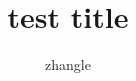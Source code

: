 \documentclass{article}
\title{test title}
\author{zhangle}
\begin{document}
 \maketitle{}
 
 
 
 
 
 \renewcommand\refname{参考文献} 
 
 
 
\end{document}

